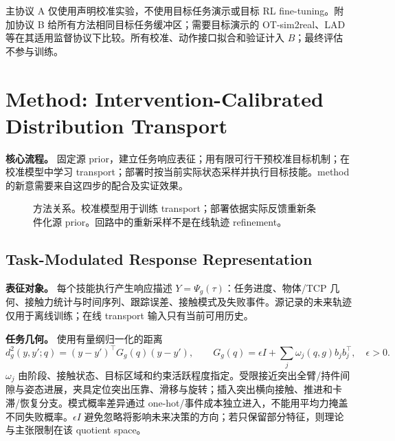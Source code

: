 \documentclass[11pt]{article}
\begin{document}
主协议 A 仅使用声明校准实验，不使用目标任务演示或目标 RL fine-tuning。附加协议 B 给所有方法相同目标任务缓冲区；需要目标演示的 OT-sim2real、LAD 等在其适用监督协议下比较。所有校准、动作接口拟合和验证计入 $B$；最终评估不参与训练。

\section{Method: Intervention-Calibrated Distribution Transport}
\label{sec:method}
\textbf{核心流程。} 固定源 prior，建立任务响应表征；用有限可行干预校准目标机制；在校准模型中学习 transport；部署时按当前实际状态采样并执行目标技能。method 的新意需要来自这四步的配合及实证效果。

\begin{figure}[ht]
\centering
{}
\caption{方法关系。校准模型用于训练 transport；部署依据实际反馈重新条件化源 prior。回路中的重新采样不是在线轨迹 refinement。}
\end{figure}

\subsection{Task-Modulated Response Representation}
\label{sec:geometry}
\textbf{表征对象。} 每个技能执行产生响应描述 $Y=\Psi_g(\tau)$：任务进度、物体/TCP 几何、接触力统计与时间序列、跟踪误差、接触模式及失败事件。源记录的未来轨迹仅用于离线训练；在线 transport 输入只有当前可用历史。

\textbf{任务几何。} 使用有量纲归一化的距离
\begin{equation}
 d_g^2(y,y';q)=(y-y')^\top G_g(q)(y-y'),\qquad
 G_g(q)=\epsilon I+\sum_j\omega_j(q,g)b_jb_j^\top,\quad\epsilon>0.
 \label{eq:metric}
\end{equation}
$\omega_j$ 由阶段、接触状态、目标区域和约束活跃程度指定。受限接近突出全臂/持件间隙与姿态进展，夹具定位突出压靠、滑移与旋转；插入突出横向接触、推进和卡滞/恢复分支。模式概率差异通过 one-hot/事件成本独立进入，不能用平均力掩盖不同失败概率。$\epsilon I$ 避免忽略将影响未来决策的方向；若只保留部分特征，则理论与主张限制在该 quotient space。
\end{document}

